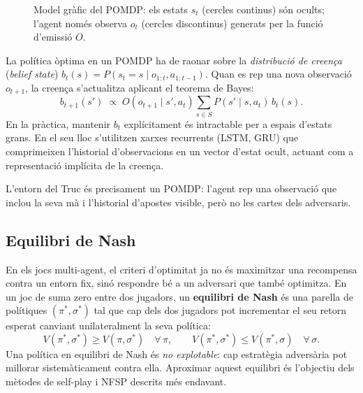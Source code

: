 \begin{figure}[H]
  \centering
  \caption{Model gràfic del \acs{POMDP}: els estats $s_t$ (cercles continus) són
           ocults; l'agent només observa $o_t$ (cercles discontinus) generats per
           la funció d'emissió $O$.}
  \label{fig:pomdp}
\end{figure}

La política òptima en un \ac{POMDP} ha de raonar sobre la
\emph{distribució de creença} (\emph{belief state}) $b_t(s) = P(s_t = s \mid
o_{1:t}, a_{1:t-1})$. Quan es rep una nova observació $o_{t+1}$, la creença
s'actualitza aplicant el teorema de Bayes:
\[
  b_{t+1}(s') \;\propto\; O(o_{t+1} \mid s', a_t)
  \sum_{s \in S} P(s' \mid s, a_t)\, b_t(s).
\]
En la pràctica, mantenir $b_t$ explícitament és intractable per a espais
d'estats grans. En el seu lloc s'utilitzen xarxes recurrents (LSTM, GRU)
que comprimeixen l'historial d'observacions en un vector d'estat
ocult, actuant com a representació implícita de la creença.

L'entorn del Truc és precisament un \ac{POMDP}: l'agent rep una observació
que inclou la seva mà i l'historial d'apostes visible, però no les cartes dels
adversaris.

\FloatBarrier
\subsection*{Equilibri de Nash}

En els jocs multi-agent, el criteri d'optimitat ja no és maximitzar una
recompensa contra un entorn fix, sinó respondre bé a un adversari que també
optimitza. En un joc de suma zero entre dos jugadors, un \textbf{equilibri de
Nash} és una parella de polítiques $(\pi^*, \sigma^*)$ tal que cap dels dos
jugadors pot incrementar el seu retorn esperat canviant unilateralment la seva
política:
\[
  V(\pi^*, \sigma^*) \geq V(\pi, \sigma^*) \quad \forall\,\pi, \qquad
  V(\pi^*, \sigma^*) \leq V(\pi^*, \sigma) \quad \forall\,\sigma.
\]
Una política en equilibri de Nash és \emph{no explotable}: cap estratègia
adversària pot millorar sistemàticament contra ella. Aproximar aquest equilibri
és l'objectiu dels mètodes de self-play i \ac{NFSP} descrits més endavant.

